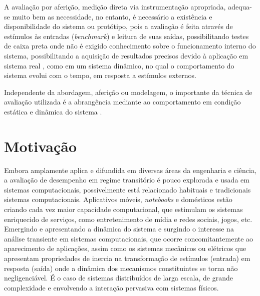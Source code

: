 A avaliação por aferição, medição direta via instrumentação apropriada, adequa-se muito bem as necessidade, no entanto, é necessário a existência e disponibilidade do sistema ou protótipo, pois a avaliação é feita através de estímulos às entradas (\textit{benchmark}) e leitura de suas saídas, possibilitando testes de caixa preta onde não é exigido conhecimento sobre o funcionamento interno do sistema, possibilitando a aquisição de resultados precisos devido à aplicação em sistema real \cite{Nobile2013}, como em um sistema dinâmico, no qual o comportamento do sistema evolui com o tempo, em resposta a estímulos externos.

Independente da abordagem, aferição ou modelagem, o importante da técnica de avaliação utilizada é a abrangência mediante ao comportamento em condição estática e dinâmica do sistema \cite{helder2014}.


\section{Motivação}

Embora amplamente aplica e difundida em diversas áreas da engenharia e ciência, a avaliação de desempenho em regime transitório é pouco explorada e usada em sistemas computacionais, possivelmente está relacionado habituais e tradicionais sistemas computacionais. Aplicativos móveis, \textit{notebooks} e \textit{} domésticos estão criando cada vez maior capacidade computacional, que estimulam os sistemas enriquecido de serviços, como entretenimento de mídia e redes sociais, jogos, etc. Emergindo e apresentando a dinâmica do sistema e surgindo o interesse na análise transiente em sistemas computacionais, que ocorre concomitantemente ao aparecimento de aplicações, assim como os sistemas mecânicos ou elétricos que apresentam propriedades de inercia na transformação de estímulos (entrada) em resposta (saída) onde a dinâmica dos mecanismos constituintes se torna não negligenciável. É o caso de sistemas distribuídos de larga escala, de grande complexidade e envolvendo a interação pervasiva com sistemas físicos. \cite{Egami2011, Kannan2011} 

